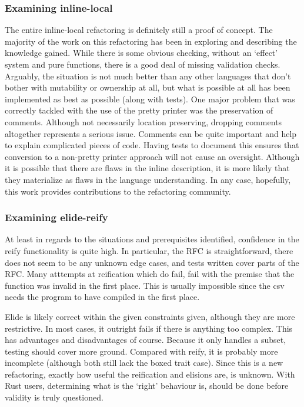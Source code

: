 \subsubsection{Examining inline-local}
The entire inline-local refactoring is definitely still a proof of concept. The majority of the work on this refactoring has been in exploring and describing the knowledge gained. While there is some obvious checking, without an `effect' system and pure functions, there is a good deal of missing validation checks. Arguably, the situation is not much better than any other languages that don't bother with mutability or ownership at all, but what is possible at all has been implemented as best as possible (along with tests). One major problem that was correctly tackled with the use of the pretty printer was the preservation of comments. Although not necessarily location preserving, dropping comments altogether represents a serious issue. Comments can be quite important and help to explain complicated pieces of code. Having tests to document this ensures that conversion to a non-pretty printer approach will not cause an oversight. Although it is possible that there are flaws in the inline description, it is more likely that they materialize as flaws in the language understanding. In any case, hopefully, this work provides contributions to the refactoring community.


\subsubsection{Examining elide-reify}

At least in regards to the situations and prerequisites identified, confidence in the reify functionality is quite high. In particular, the RFC is straightforward, there does not seem to be any unknown edge cases, and tests written cover parts of the RFC. Many atttempts at reification which do fail, fail with the premise that the function was invalid in the first place. This is usually impossible since the csv needs the program to have compiled in the first place. 

Elide is likely correct within the given constraints given, although they are more restrictive. In most cases, it outright fails if there is anything too complex. This has advantages and disadvantages of course. Because it only handles a subset, testing should cover more ground. Compared with reify, it is probably more incomplete (although both still lack the boxed trait case). Since this is a new refactoring, exactly how useful the reification and elisions are, is unknown. With Rust users, determining what is the `right' behaviour is, should be done before validity is truly questioned.

